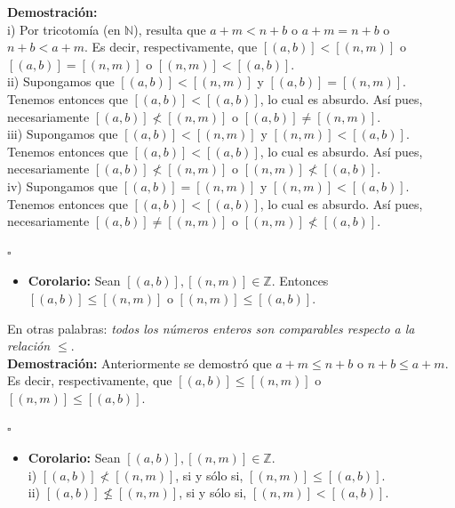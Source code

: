 \documentclass[10 pt]{article}
\begin{document}
\Large{\textbf{Demostración:} \\

i) Por tricotomía (en $\mathbb N$), resulta que $a+m<n+b$ o $a+m=n+b$ o $n+b<a+m$. Es decir, respectivamente, que $[(a,b)]<[(n,m)]$ o $[(a,b)]=[(n,m)]$ o $[(n,m)]<[(a,b)]$. \\

ii) Supongamos que $[(a,b)]<[(n,m)]$ y $[(a,b)]=[(n,m)]$. Tenemos entonces que $[(a,b)]<[(a,b)]$, lo cual es absurdo. Así pues, necesariamente $[(a,b)] \nless [(n,m)]$ o $[(a,b)] \neq [(n,m)]$. \\

iii) Supongamos que $[(a,b)]<[(n,m)]$ y $[(n,m)]<[(a,b)]$. Tenemos entonces que $[(a,b)]<[(a,b)]$, lo cual es absurdo. Así pues, necesariamente $[(a,b)] \nless [(n,m)]$ o $[(n,m)] \nless [(a,b)]$. \\

iv) Supongamos que $[(a,b)]=[(n,m)]$ y $[(n,m)]<[(a,b)]$. Tenemos entonces que $[(a,b)]<[(a,b)]$, lo cual es absurdo. Así pues, necesariamente $[(a,b)] \neq [(n,m)]$ o $[(n,m)] \nless [(a,b)]$.} \\

\begin{flushright}
    $\square$
\end{flushright}

\begin{itemize}
    \item \Large{\textbf{Corolario:} Sean $[(a,b)],[(n,m)] \in \mathbb Z$. Entonces $[(a,b)] \leq [(n,m)]$ o $[(n,m)] \leq [(a,b)]$.} \\
\end{itemize}

\Large{En otras palabras: \textit{todos los números enteros son comparables respecto a la relación $\leq$}.} \\

\Large{\textbf{Demostración:} Anteriormente se demostró que $a+m \leq n+b$ o $n+b \leq a+m$. Es decir, respectivamente, que $[(a,b)] \leq [(n,m)]$ o $[(n,m)] \leq [(a,b)]$.} \\

\begin{flushright}
    $\square$
\end{flushright}

\begin{itemize}
    \item \Large{\textbf{Corolario:} Sean $[(a,b)],[(n,m)] \in \mathbb Z$. \\

    i) $[(a,b)] \nless [(n,m)]$, si y sólo si, $[(n,m)] \leq [(a,b)]$. \\

    ii) $[(a,b)] \nleq [(n,m)]$, si y sólo si, $[(n,m)]<[(a,b)]$.}\\
\end{itemize}
\end{document}
